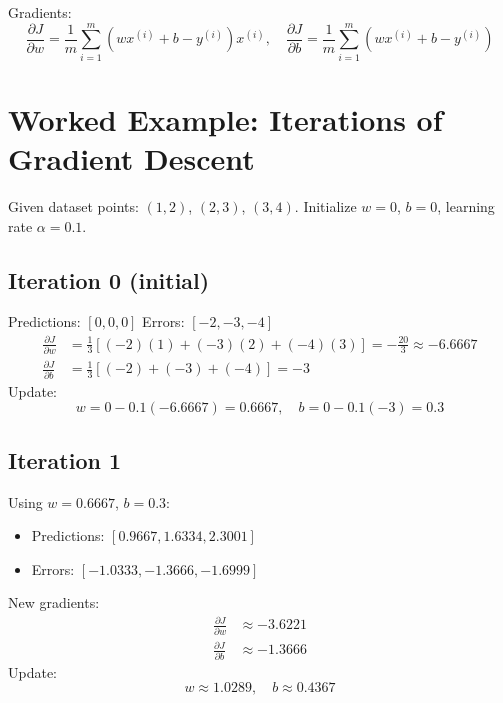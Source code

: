 \documentclass[12pt,a4paper]{article}
\begin{document}
Gradients:
\begin{equation}
\frac{\partial J}{\partial w} = \frac{1}{m}\sum_{i=1}^{m}(wx^{(i)} + b - y^{(i)})x^{(i)}, \quad
\frac{\partial J}{\partial b} = \frac{1}{m}\sum_{i=1}^{m}(wx^{(i)} + b - y^{(i)})
\end{equation}

\section{\textcolor{primary}{Worked Example: Iterations of Gradient Descent}}

Given dataset points: $(1,2)$, $(2,3)$, $(3,4)$. Initialize $w=0$, $b=0$, learning rate $\alpha = 0.1$.

\subsection*{Iteration 0 (initial)}
Predictions: $[0,0,0]$\newline
Errors: $[-2,-3,-4]$
\begin{align}
\frac{\partial J}{\partial w} &= \frac{1}{3}[(-2)(1)+(-3)(2)+(-4)(3)] = -\frac{20}{3} \approx -6.6667 \\
\frac{\partial J}{\partial b} &= \frac{1}{3}[(-2)+(-3)+(-4)] = -3
\end{align}
Update:
\begin{equation}
w=0-0.1(-6.6667)=0.6667,\quad b=0-0.1(-3)=0.3
\end{equation}

\subsection*{Iteration 1}
Using $w=0.6667$, $b=0.3$:
\begin{itemize}[noitemsep]
    \item Predictions: $[0.9667,1.6334,2.3001]$
    \item Errors: $[-1.0333,-1.3666,-1.6999]$
\end{itemize}

New gradients:
\begin{align}
\frac{\partial J}{\partial w} &\approx -3.6221 \\
\frac{\partial J}{\partial b} &\approx -1.3666
\end{align}
Update:
\begin{equation}
w\approx1.0289,\quad b\approx0.4367
\end{equation}
\end{document}
